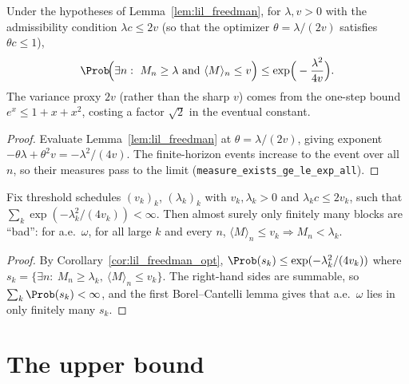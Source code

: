 \begin{corollary}\label{cor:lil_freedman_opt}
\leanok
{}
Under the hypotheses of Lemma~\ref{lem:lil_freedman}, for $\lambda, v > 0$ with the
admissibility condition $\lambda c \le 2v$ (so that the optimizer $\theta=\lambda/(2v)$
satisfies $\theta c\le 1$),
\[
  \Prob\!\Big(\exists n:\ M_n \ge \lambda \ \text{and}\ \langle M\rangle_n \le v\Big)
  \le \exp\!\Big(-\frac{\lambda^2}{4v}\Big).
\]
The variance proxy $2v$ (rather than the sharp $v$) comes from the one-step bound
$e^x\le 1+x+x^2$, costing a factor $\sqrt2$ in the eventual constant.
\end{corollary}

\begin{proof}\leanok
{}
Evaluate Lemma~\ref{lem:lil_freedman} at $\theta=\lambda/(2v)$, giving exponent
$-\theta\lambda+\theta^2 v = -\lambda^2/(4v)$. The finite-horizon events increase to the
event over all $n$, so their measures pass to the limit
(\texttt{measure\_exists\_ge\_le\_exp\_all}).
\end{proof}

\begin{lemma}\label{lem:lil_bc}
\leanok
{}
Fix threshold schedules $(v_k)_{k}$, $(\lambda_k)_k$ with $v_k,\lambda_k>0$ and
$\lambda_k c\le 2v_k$, such that $\sum_k \exp(-\lambda_k^2/(4v_k))<\infty$. Then almost
surely only finitely many blocks are ``bad'': for a.e.\ $\omega$, for all large $k$ and
every $n$, $\langle M\rangle_n\le v_k \Rightarrow M_n < \lambda_k$.
\end{lemma}

\begin{proof}\leanok
{}
By Corollary~\ref{cor:lil_freedman_opt}, $\Prob(s_k)\le\exp(-\lambda_k^2/(4v_k))$ where
$s_k=\{\exists n:\ M_n\ge\lambda_k,\ \langle M\rangle_n\le v_k\}$. The right-hand sides are
summable, so $\sum_k\Prob(s_k)<\infty$, and the first Borel--Cantelli lemma gives that a.e.\
$\omega$ lies in only finitely many $s_k$.
\end{proof}

\section{The upper bound}
\label{sec:pre_lil_upper}

